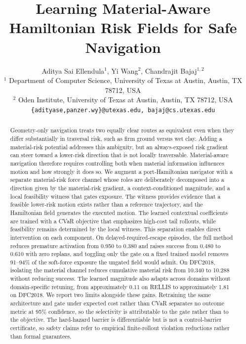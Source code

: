 \documentclass{article}
\title{Learning Material-Aware Hamiltonian Risk Fields for Safe Navigation}
\author{%
Aditya Sai Ellendula$^{1}$, Yi Wang$^{2}$, Chandrajit Bajaj$^{1,2}$ \\
$^{1}$ Department of Computer Science, University of Texas at Austin, Austin, TX 78712, USA \\
$^{2}$ Oden Institute, University of Texas at Austin, Austin, TX 78712, USA \\
\texttt{\{adityase,panzer.wy\}@utexas.edu, bajaj@cs.utexas.edu} \\
}
\theoremstyle{definition}
\begin{document}
\maketitle


\begin{abstract}
Geometry-only navigation treats two equally clear routes as equivalent even when they differ substantially in traversal risk, such as firm ground versus wet clay. Adding a material-risk potential addresses this ambiguity, but an always-exposed risk gradient can steer toward a lower-risk direction that is not locally traversable. Material-aware navigation therefore requires controlling both when material information influences motion and how strongly it does so. We augment a port-Hamiltonian navigator with a separate material-risk force channel whose roles are deliberately decomposed into a direction given by the material-risk gradient, a context-conditioned magnitude, and a local feasibility witness that gates exposure. The witness provides evidence that a feasible lower-risk motion exists rather than a reference trajectory, and the Hamiltonian field generates the executed motion. The learned contextual coefficients are trained with a CVaR objective that emphasizes high-cost tail rollouts, while feasibility remains determined by the local witness. This separation enables direct intervention on each component. On delayed-required-escape episodes, the full method reduces premature activation from 0.950 to 0.380 and raises success from 0.480 to 0.610 with zero replans, and toggling only the gate on a fixed trained model removes 91--94\% of the soft-force exposure the ungated field would admit. On DFC2018, isolating the material channel reduces cumulative material risk from 10.340 to 10.288 without reducing success. The learned magnitude also adapts across domains without domain-specific retuning, from approximately 0.11 on RELLIS to approximately 1.81 on DFC2018. We report two limits alongside these gains. Retraining the same architecture and gate under expected cost rather than CVaR separates no outcome metric at 95\% confidence, so the selectivity is attributable to the gate rather than to the objective. The hard-hazard barrier is differentiable but is not a control-barrier certificate, so safety claims refer to empirical finite-rollout violation reductions rather than formal guarantees.
\end{abstract}






\end{document}
